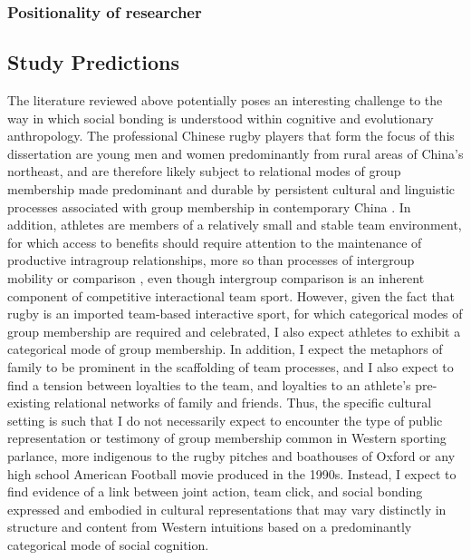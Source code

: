 \subsubsection{Positionality of researcher}


\subsection{Study Predictions}


The literature reviewed above potentially poses an interesting challenge to the way in which social bonding is understood within cognitive and evolutionary anthropology.  The professional Chinese rugby players that form the focus of this dissertation are young men and women predominantly from rural areas of China's northeast, and are therefore likely subject to relational modes of group membership made predominant and durable by persistent cultural and linguistic processes associated with group membership in contemporary China \citep{Liu2009}.  In addition, athletes are members of a relatively small and stable team environment, for which access to benefits should require attention to the maintenance of productive intragroup relationships, more so than processes of intergroup mobility or comparison \citep{Schug2010}, even though intergroup comparison is an inherent component of competitive interactional team sport. However, given the fact that rugby is an imported team-based interactive sport, for which categorical modes of group membership are required and celebrated, I also expect athletes to exhibit a categorical mode of group membership.
In addition, I expect the metaphors of family to be prominent in the scaffolding of team processes, and I also expect to find a tension between loyalties to the team, and loyalties to an athlete's pre-existing relational networks of family and friends\citep{Yang1994}.  Thus, the specific cultural setting is such that I do not necessarily expect to encounter the type of public representation or testimony of group membership common in Western sporting parlance, more indigenous to the rugby pitches and boathouses of Oxford or any high school American Football movie produced in the 1990s.  Instead, I expect to find evidence of a link between joint action, team click, and social bonding expressed and embodied in cultural representations that may vary distinctly in structure and content from Western intuitions based on a predominantly categorical mode of social cognition.

